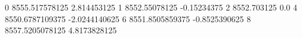 0 8555.517578125 2.814453125
1 8552.55078125 -0.15234375
2 8552.703125 0.0
4 8550.6787109375 -2.0244140625
6 8551.8505859375 -0.8525390625
8 8557.5205078125 4.8173828125
